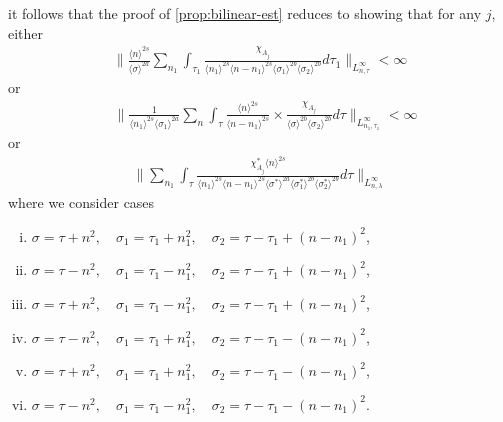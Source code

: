 \documentclass[12pt,reqno]{amsart}
\numberwithin{equation}{section}  %
\begin{document}
%
%
it follows that the proof of \cref{prop:bilinear-est} reduces to showing that
for any $j$, either 
%
%
\begin{equation}
  \label{sup-est-gen-per-1}
  \begin{split}
    \| \frac{ \langle n
    \rangle ^{2s}}{\langle \sigma \rangle ^{2a}}
    \sum_{n_{1}} \int_{\tau_{1}} \frac{\chi_{A_{j}}}{ \langle n_{1} \rangle ^{2s} \langle n-n_{1} \rangle ^{2s} 
    \langle \sigma_{1} \rangle^{2b} \langle  \sigma_{2} \rangle^{2b} }
    d \tau_1  \|_{L^{\infty}_{n, \tau}} < \infty
  \end{split}
\end{equation}
%
%
or 
\begin{equation}
  \label{sup-est-gen-per-2}
\begin{split}
  & \| \frac{1}{\langle n_{1} \rangle ^{2s}
  \langle \sigma_{1} \rangle
  ^{2a}} \sum_{n} \int_{\tau} \frac{\langle n \rangle ^{2s}}{\langle
  n - n_{1}\rangle ^{2s}}  \times \frac{\chi_{A_{j}}}{\langle
  \sigma \rangle^{2b}  \langle \sigma_{2} \rangle^{2b} } d \tau 
  \|_{L^{\infty}_{n_{1}, \tau_{1}}} < \infty
\end{split}
\end{equation}
%
or
\begin{equation}
  \label{sup-est-gen-per-3}
\begin{split}
  \| \sum_{n_{1}} \int_{\tau} \frac{\chi^{*}_{A_{j}}
    \langle n \rangle ^{2s}
    }{ \langle n_{1} \rangle^{2s} \langle
    n-n_{1} \rangle ^{2s} \langle \sigma^{*}  
    \rangle ^{2a}
    \langle \sigma_{1}^{*} \rangle^{2b}
    \langle  \sigma_{2}^{*} \rangle^{2b}  } d \tau  \|_{L^{\infty}_{n, \lambda}}
\end{split}
\end{equation}
%
%
where we consider cases
\begin{enumerate}[(i)]
    \item $ \sigma=\tau+n^2,\quad \sigma_1=\tau_1+n_1^2,\quad \sigma_2=\tau -
      \tau_1+(n - n_1)^2$,
\label{it-1}
    \item $ \sigma=\tau-n^2,\quad \sigma_1=\tau_1-n_1^2,\quad \sigma_2=\tau - \tau_1+(n - n_1)^2$,
\label{it-2}
    \item  $\sigma=\tau+n^2,\quad \sigma_1=\tau_1-n_1^2,\quad \sigma_2=\tau - \tau_1+(n - n_1)^2$,
      \label{it-3}
    \item $\sigma=\tau-n^2,\quad \sigma_1=\tau_1+n_1^2,\quad \sigma_2=\tau - \tau_1-(n - n_1)^2$,
\label{it-4}
    \item $\sigma=\tau+n^2,\quad \sigma_1=\tau_1+n_1^2,\quad \sigma_2=\tau - \tau_1-(n - n_1)^2$,
\label{it-5}
    \item $\sigma=\tau-n^2,\quad \sigma_1=\tau_1-n_1^2,\quad \sigma_2=\tau - \tau_1-(n - n_1)^2$.
\label{it-6}
\end{enumerate}
\end{document}
